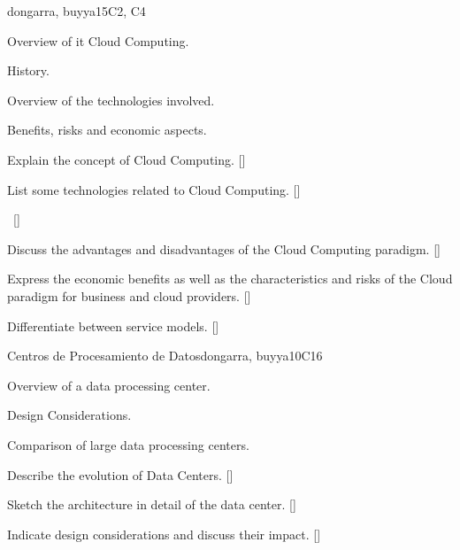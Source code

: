 \begin{syllabus}
\begin{unit}{\PDCloudComputing}{}{dongarra, buyya}{15}{C2, C4}
\begin{topics}
    \item Overview of it Cloud Computing.
    \item History.
    \item Overview of the technologies involved.
    \item Benefits, risks and economic aspects.
    \item \PDCloudComputingTopicCloud
    \item \PDCloudComputingTopicInternet
\end{topics}
\begin{learningoutcomes}
    \item Explain the concept of Cloud Computing. [\Familiarity]
    \item List some technologies related to Cloud Computing. [\Familiarity]
    \item \PDCloudComputingLOExplainStrategies~[\Familiarity] %
    \item Discuss the advantages and disadvantages of the Cloud Computing paradigm.  [\Familiarity]
    \item Express the economic benefits as well as the characteristics and risks of the Cloud paradigm for business and cloud providers.   [\Familiarity]
    \item Differentiate between service models.   [\Usage]
\end{learningoutcomes}
\end{unit}

\begin{unit}{Centros de Procesamiento de Datos}{}{dongarra, buyya}{10}{C16}
\begin{topics}
    \item Overview of a data processing center.
    \item Design Considerations.
    \item Comparison of large data processing centers.
\end{topics}
\begin{learningoutcomes}
    \item Describe the evolution of Data Centers. [\Familiarity]
    \item Sketch the architecture in detail of the data center. [\Familiarity]
    \item Indicate design considerations and discuss their impact.  [\Familiarity]
\end{learningoutcomes}
\end{unit}


\end{syllabus}
